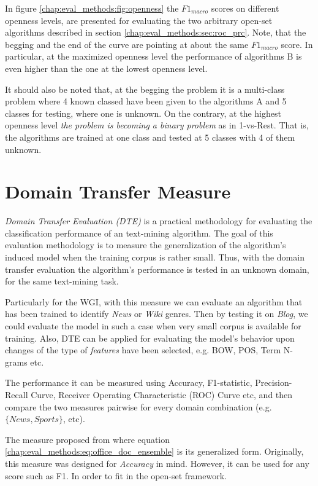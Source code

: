 In figure \ref{chap:eval_methods:fig:openness} the $F1_{macro}$ scores on different openness levels, are presented for evaluating the two arbitrary open-set algorithms described in section \ref{chap:eval_methods:sec:roc_prc}. Note, that the begging and the end of the curve are pointing at about the same $F1_{macro}$ score. In particular, at the maximized openness level the performance of algorithms B is even higher than the one at the lowest openness level. 

It should also be noted that, at the begging the problem it is a multi-class problem where 4 known classed have been given to the algorithms A and 5 classes for testing, where one is unknown. On the contrary, at the highest openness level \textit{the problem is becoming a binary problem} as in 1-vs-Rest. That is, the algorithms are trained at one class and tested at 5 classes with 4 of them unknown.


\section{Domain Transfer Measure}\label{chap:eval_methods:sec:domain_transfer_measure}

\textit{Domain Transfer Evaluation (DTE)} is a practical methodology for evaluating the classification performance of an text-mining algorithm. The goal of this evaluation methodology is to measure the generalization of the algorithm's induced model when the training corpus is rather small. Thus, with the domain transfer evaluation the algorithm's performance is tested in an unknown domain, for the same text-mining task. 

Particularly for the WGI, with this measure we can evaluate an algorithm that has been trained to identify \textit{News} or \textit{Wiki} genres. Then by testing it on \textit{Blog}, we could evaluate the model in such a case when very small corpus is available for training. Also, DTE can be applied for evaluating the model's behavior upon changes of the type of \textit{features} have been selected, e.g. BOW, POS, Term N-grams etc. 

The performance it can be measured using Accuracy, F1-statistic, Precision-Recall Curve, Receiver Operating Characteristic (ROC) Curve etc, and then compare the two measures pairwise for every domain combination (e.g. $\{News, Sports\}$, etc).

The measure proposed from \parencite{finn2006learning} where equation \ref{chap:eval_methods:eq:office_doc_ensemble} is its generalized form. Originally, this measure was designed for \textit{Accuracy} in mind. However, it can be used for any score such as F1. In order to fit in the open-set framework.

